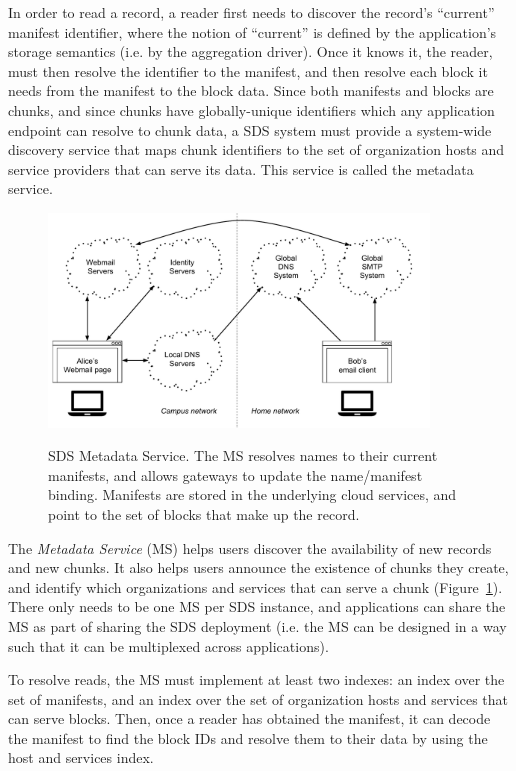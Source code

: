 In order to read a record, a reader first
needs to discover the record's ``current'' manifest identifier, where the notion
of ``current'' is defined by the application's storage semantics (i.e. by the
aggregation driver).  Once it knows it, the reader, must then resolve the
identifier to the manifest, and then resolve each block it needs from the
manifest to the block data.  Since both manifests and blocks are chunks,
and since chunks have globally-unique identifiers which any application endpoint
can resolve to chunk data, a SDS
system must provide a system-wide discovery service that maps chunk identifiers to the set of
organization hosts and service providers that can serve its data.
This service is called the metadata service.

\begin{figure}[h]
   \caption{SDS Metadata Service.  The MS resolves names to their current
   manifests, and allows gateways to update the name/manifest binding.
   Manifests are stored in the underlying cloud services, and
   point to the set of blocks that make up the record.}
   \centering
   \includegraphics[width=0.9\textwidth,page=5]{figures/dissertation-figures}
   \label{fig:chap2-metadata-service}
\end{figure}

The \emph{Metadata Service} (MS) helps users discover the
availability of new records and new chunks.  It also helps users
announce the existence of chunks they create, and
identify which organizations and services that can serve a chunk
(Figure~\ref{fig:chap2-metadata-service}).
There only needs to be one MS per SDS instance, and
applications can share the MS as part of sharing the SDS deployment (i.e. the MS
can be designed in a way such that it can be multiplexed across applications).

To resolve reads, the MS must implement at least two indexes:
an index over the set of manifests, and an index over the set of organization
hosts and services that can serve blocks.  Then, once a reader has obtained the
manifest, it can decode the manifest to find the block IDs and resolve them to
their data by using the host and services index.

